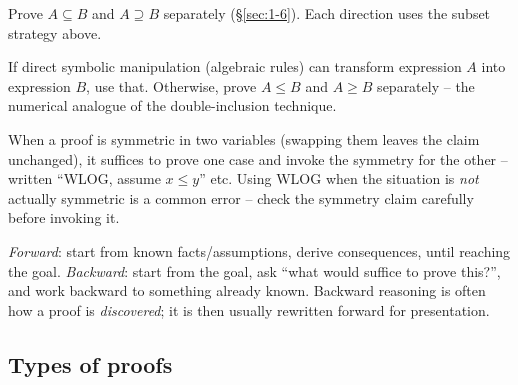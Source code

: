 \documentclass[11pt]{article}
\begin{document}
\begin{note}[Strategy: proving $A = B$ (sets)]
Prove $A \subseteq B$ and $A \supseteq B$ separately (\S\ref{sec:1-6}). Each direction uses the subset strategy above.
\end{note}

\begin{note}[Strategy: proving $A = B$ (numbers)]
If direct symbolic manipulation (algebraic rules) can transform expression $A$ into expression $B$, use that. Otherwise, prove $A \le B$ and $A \ge B$ separately -- the numerical analogue of the double-inclusion technique.
\end{note}

\begin{note}
When a proof is symmetric in two variables (swapping them leaves the claim unchanged), it suffices to prove one case and invoke the symmetry for the other -- written ``WLOG, assume $x\le y$'' etc. Using WLOG when the situation is \emph{not} actually symmetric is a common error -- check the symmetry claim carefully before invoking it.
\end{note}

\begin{note}
\emph{Forward}: start from known facts/assumptions, derive consequences, until reaching the goal. \emph{Backward}: start from the goal, ask ``what would suffice to prove this?'', and work backward to something already known. Backward reasoning is often how a proof is \emph{discovered}; it is then usually rewritten forward for presentation.
\end{note}

\subsection{Types of proofs}
\label{sec:3-5}
\end{document}
